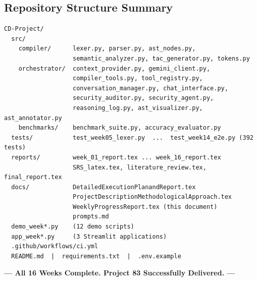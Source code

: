 \documentclass[a4paper,11pt]{article}
\begin{document}
\subsection*{Repository Structure Summary}
\begin{lstlisting}
CD-Project/
  src/
    compiler/      lexer.py, parser.py, ast_nodes.py,
                   semantic_analyzer.py, tac_generator.py, tokens.py
    orchestrator/  context_provider.py, gemini_client.py,
                   compiler_tools.py, tool_registry.py,
                   conversation_manager.py, chat_interface.py,
                   security_auditor.py, security_agent.py,
                   reasoning_log.py, ast_visualizer.py, ast_annotator.py
    benchmarks/    benchmark_suite.py, accuracy_evaluator.py
  tests/           test_week05_lexer.py  ...  test_week14_e2e.py (392 tests)
  reports/         week_01_report.tex ... week_16_report.tex
                   SRS_latex.tex, literature_review.tex, final_report.tex
  docs/            DetailedExecutionPlanandReport.tex
                   ProjectDescriptionMethodologicalApproach.tex
                   WeeklyProgressReport.tex (this document)
                   prompts.md
  demo_week*.py    (12 demo scripts)
  app_week*.py     (3 Streamlit applications)
  .github/workflows/ci.yml
  README.md  |  requirements.txt  |  .env.example
\end{lstlisting}

\vspace{4mm}
\begin{center}
    \large\textbf{--- All 16 Weeks Complete. Project 83 Successfully Delivered. ---}
\end{center}
\end{document}
